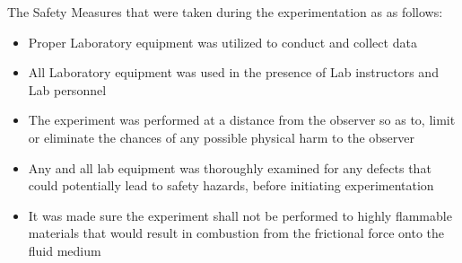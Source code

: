 

{The Safety Measures that were taken during the experimentation as as follows:}

	\begin{itemize}
		\item {Proper Laboratory equipment was utilized to conduct and collect data}
		\item {All Laboratory equipment was used in the presence of Lab instructors and Lab personnel}
		\item {The experiment was performed at a distance from the observer so as to, limit or eliminate the chances of any possible physical harm to the observer}
		\item {Any and all lab equipment was thoroughly examined for any defects that could potentially lead to safety hazards, before initiating experimentation}
		\item {It was made sure the experiment shall not be performed to highly flammable materials that would result in combustion from the frictional force onto the fluid medium}
	\end{itemize}

